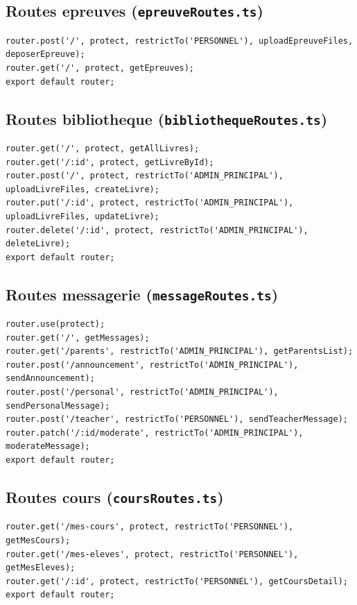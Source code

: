 \documentclass[12pt,a4paper]{article}
\begin{document}
\subsection{Routes epreuves (\texttt{epreuveRoutes.ts})}

\begin{lstlisting}[style=code]
router.post('/', protect, restrictTo('PERSONNEL'), uploadEpreuveFiles, deposerEpreuve);
router.get('/', protect, getEpreuves);
export default router;
\end{lstlisting}

\subsection{Routes bibliotheque (\texttt{bibliothequeRoutes.ts})}

\begin{lstlisting}[style=code]
router.get('/', protect, getAllLivres);
router.get('/:id', protect, getLivreById);
router.post('/', protect, restrictTo('ADMIN_PRINCIPAL'), uploadLivreFiles, createLivre);
router.put('/:id', protect, restrictTo('ADMIN_PRINCIPAL'), uploadLivreFiles, updateLivre);
router.delete('/:id', protect, restrictTo('ADMIN_PRINCIPAL'), deleteLivre);
export default router;
\end{lstlisting}

\subsection{Routes messagerie (\texttt{messageRoutes.ts})}

\begin{lstlisting}[style=code]
router.use(protect);
router.get('/', getMessages);
router.get('/parents', restrictTo('ADMIN_PRINCIPAL'), getParentsList);
router.post('/announcement', restrictTo('ADMIN_PRINCIPAL'), sendAnnouncement);
router.post('/personal', restrictTo('ADMIN_PRINCIPAL'), sendPersonalMessage);
router.post('/teacher', restrictTo('PERSONNEL'), sendTeacherMessage);
router.patch('/:id/moderate', restrictTo('ADMIN_PRINCIPAL'), moderateMessage);
export default router;
\end{lstlisting}

\subsection{Routes cours (\texttt{coursRoutes.ts})}

\begin{lstlisting}[style=code]
router.get('/mes-cours', protect, restrictTo('PERSONNEL'), getMesCours);
router.get('/mes-eleves', protect, restrictTo('PERSONNEL'), getMesEleves);
router.get('/:id', protect, restrictTo('PERSONNEL'), getCoursDetail);
export default router;
\end{lstlisting}
\end{document}
